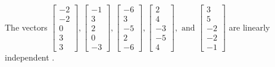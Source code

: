 \begin{exercise}
\begin{exerciseStatement}
  \end{exerciseStatement}
  \begin{exerciseAnswer}
   The vectors \(\left[\begin{array}{r}
-2 \\
-2 \\
0 \\
3 \\
3
\end{array}\right] , \left[\begin{array}{r}
-1 \\
3 \\
2 \\
0 \\
-3
\end{array}\right] , \left[\begin{array}{r}
-6 \\
3 \\
-5 \\
2 \\
-6
\end{array}\right] , \left[\begin{array}{r}
2 \\
4 \\
-3 \\
-5 \\
4
\end{array}\right] , \text{ and } \left[\begin{array}{r}
3 \\
5 \\
-2 \\
-2 \\
-1
\end{array}\right]\) are 
  	 linearly independent  .
  


  \end{exerciseAnswer}
\end{exercise}